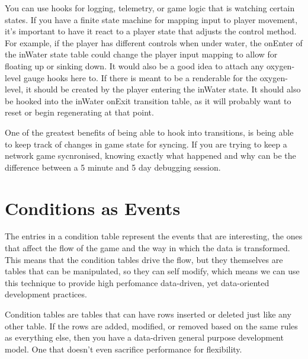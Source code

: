 You can use hooks for logging, telemetry, or game logic that is watching
certain states.  If you have a finite state machine for mapping input to player
movement, it's important to have it react to a player state that adjusts the
control method. For example, if the player has different controls when under
water, the onEnter of the inWater state table could change the player input
mapping to allow for floating up or sinking down. It would also be a good idea
to attach any oxygen-level gauge hooks here to. If there is meant to be a
renderable for the oxygen-level, it should be created by the player entering
the inWater state. It should also be hooked into the inWater onExit transition
table, as it will probably want to reset or begin regenerating at that point.

One of the greatest benefits of being able to hook into transitions, is being
able to keep track of changes in game state for syncing. If you are trying to
keep a network game sycnronised, knowing exactly what happened and why can be
the difference between a 5 minute and 5 day debugging session.

\section{Conditions as Events}

The entries in a condition table represent the events that are interesting, the
ones that affect the flow of the game and the way in which the data is
transformed. This means that the condition tables drive the flow, but they
themselves are tables that can be manipulated, so they can self modify, which
means we can use this technique to provide high perfomance data-driven, yet
data-oriented development practices.

Condition tables are tables that can have rows inserted or deleted just like
any other table. If the rows are added, modified, or removed based on the same
rules as everything else, then you have a data-driven general purpose
development model. One that doesn't even sacrifice performance for flexibility.


